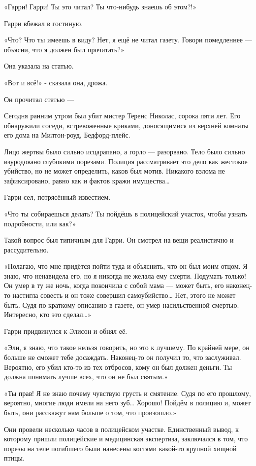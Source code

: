 \documentclass[a5paper, 9pt,
final, openany, twoside=true]{memoir}
\begin{document}
«Гарри! Гарри! Ты это читал? Ты что-нибудь знаешь об этом?!»

Гарри вбежал в гостиную.

«Что? Что ты имеешь в виду? Нет, я ещё не читал газету. Говори помедленнее — объясни, что я должен был прочитать?»

Она указала на статью.

«Вот и всё!» - сказала она, дрожа.

Он прочитал статью —\bigskip

Сегодня ранним утром был убит мистер Теренс Николас, сорока пяти лет. Его обнаружили соседи, встревоженные криками, доносящимися из верхней комнаты его дома на Милтон-роуд, Бедфорд-плейс.

Лицо жертвы было сильно исцарапано, а горло — разорвано. Тело было сильно изуродовано глубокими порезами. Полиция рассматривает это дело как жестокое убийство, но не может определить, каков был мотив. Никакого взлома не зафиксировано, равно как и фактов кражи имущества…\bigskip

Гарри сел, потрясённый известием.

«Что ты собираешься делать? Ты пойдёшь в полицейский участок, чтобы узнать подробности, или как?»

Такой вопрос был типичным для Гарри. Он смотрел на вещи реалистично и рассудительно.

«Полагаю, что мне придётся пойти туда и объяснить, что он был моим отцом. Я знаю, что ненавидела его, но я никогда не желала ему смерти. Подумать только! Он умер в ту же ночь, когда покончила с собой мама — может быть, его наконец-то настигла совесть и он тоже совершил самоубийство… Нет, этого не может быть. Судя по краткому описанию в газете, он умер насильственной смертью. Интересно, кто это сделал…»

Гарри придвинулся к Элисон и обнял её.

«Эли, я знаю, что такое нельзя говорить, но это к лучшему. По крайней мере, он больше не сможет тебе досаждать. Наконец-то он получил то, что заслуживал. Вероятно, его убил кто-то из тех отбросов, кому он был должен деньги. Ты должна понимать лучше всех, что он не был святым.»

«Ты прав! Я не знаю почему чувствую грусть и смятение. Судя по его прошлому, вероятно, многие люди имели на него зуб… Хорошо! Пойдём в полицию и, может быть, они расскажут нам больше о том, что произошло.»

Они провели несколько часов в полицейском участке. Единственный вывод, к которому пришли полицейские и медицинская экспертиза, заключался в том, что порезы на теле погибшего были нанесены когтями какой-то крупной хищной птицы.
\end{document}
